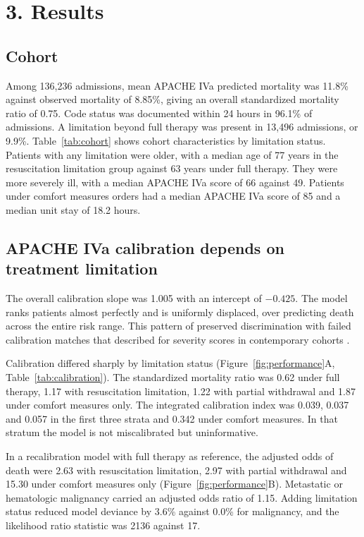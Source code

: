 \documentclass[12pt,a4paper]{article}
\begin{document}
\section*{3. Results}

\subsection*{Cohort}
Among 136{,}236 admissions, mean APACHE IVa predicted mortality was 11.8\%
against observed mortality of 8.85\%, giving an overall standardized mortality
ratio of 0.75. Code status was documented within 24 hours in 96.1\% of
admissions. A limitation beyond full therapy was present in 13{,}496 admissions,
or 9.9\%. Table~\ref{tab:cohort} shows cohort characteristics by limitation
status. Patients with any limitation were older, with a median age of 77 years in
the resuscitation limitation group against 63 years under full therapy. They were
more severely ill, with a median APACHE IVa score of 66 against 49. Patients
under comfort measures orders had a median APACHE IVa score of 85 and a median
unit stay of 18.2 hours.

\subsection*{APACHE IVa calibration depends on treatment limitation}
The overall calibration slope was 1.005 with an intercept of $-0.425$. The model
ranks patients almost perfectly and is uniformly displaced, over predicting death
across the entire risk range. This pattern of preserved discrimination with
failed calibration matches that described for severity scores in contemporary
cohorts \cite{ref18}.

Calibration differed sharply by limitation status
(Figure~\ref{fig:performance}A, Table~\ref{tab:calibration}). The standardized
mortality ratio was 0.62 under full therapy, 1.17 with resuscitation limitation,
1.22 with partial withdrawal and 1.87 under comfort measures only. The integrated
calibration index was 0.039, 0.037 and 0.057 in the first three strata and 0.342
under comfort measures. In that stratum the model is not miscalibrated but
uninformative.

In a recalibration model with full therapy as reference, the adjusted odds of
death were 2.63 with resuscitation limitation, 2.97 with partial withdrawal and
15.30 under comfort measures only (Figure~\ref{fig:performance}B). Metastatic or
hematologic malignancy carried an adjusted odds ratio of 1.15. Adding limitation
status reduced model deviance by 3.6\% against 0.0\% for malignancy, and the
likelihood ratio statistic was 2136 against 17.
\end{document}

